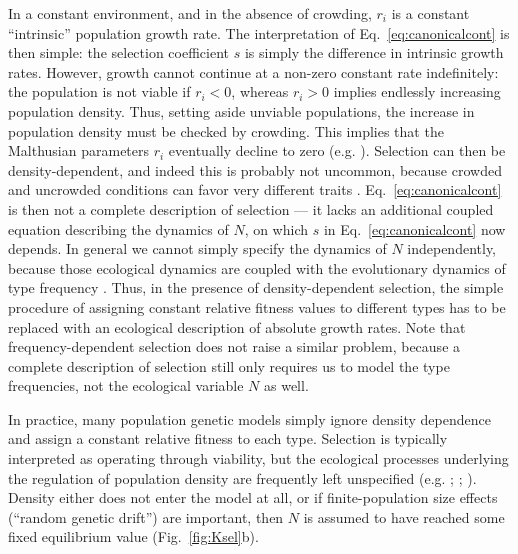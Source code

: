 \documentclass[12pt]{article}
\begin{document}
In a constant environment, and in the absence of crowding, $r_i$ is a constant ``intrinsic'' population growth rate. The interpretation of Eq.~\eqref{eq:canonicalcont} is then simple: the selection coefficient $s$ is simply the difference in intrinsic growth rates. However, growth cannot continue at a non-zero constant rate indefinitely: the population is not viable if $r_i<0$, whereas  $r_i>0$ implies endlessly increasing population density. Thus, setting aside unviable populations, the increase in population density must be checked by crowding. This implies that the Malthusian parameters $r_i$ eventually decline to zero (e.g. \citealt[pp. 203]{begon_1990}). Selection can then be density-dependent, and indeed this is probably not uncommon, because crowded and uncrowded conditions can favor very different traits \citep{travis_2013}. Eq.~\eqref{eq:canonicalcont} is then not a complete description of selection --- it lacks an additional coupled equation describing the dynamics of $N$, on which $s$ in Eq.~\eqref{eq:canonicalcont} now depends. In general we cannot simply specify the dynamics of $N$ independently, because those ecological dynamics are coupled with the evolutionary dynamics of type frequency \citep{travis_2013}. Thus, in the presence of density-dependent selection, the simple procedure of assigning constant relative fitness values to different types has to be replaced with an ecological description of absolute growth rates. Note that frequency-dependent selection does not raise a similar problem, because a complete description of selection still only requires us to model the type frequencies, not the ecological variable $N$ as well. 

In practice, many population genetic models simply ignore density dependence and assign a constant relative fitness to each type. Selection is typically interpreted as operating through viability, but the ecological processes underlying the regulation of population density are frequently left unspecified (e.g. \citealt{gillespie_2004}; \citealt{nagylaki_1992}; \citealt{ewens_2004}). Density either does not enter the model at all, or if finite-population size effects (``random genetic drift'') are important, then $N$ is assumed to have reached some fixed equilibrium value (Fig.~\ref{fig:Ksel}b). 
\end{document}
